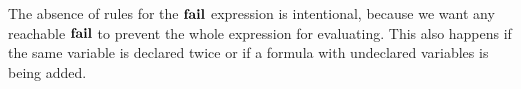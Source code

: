 \begin{center}
\begin{minipage}[t]{0.45\textwidth}
  \begin{prooftree}
  \end{prooftree}
\end{minipage}
\begin{minipage}[t]{0.45\textwidth}
  \begin{prooftree}
  \end{prooftree}
\end{minipage}
\end{center}

\bigskip

\begin{prooftree}
\end{prooftree}

\bigskip

\begin{prooftree}
\end{prooftree}

\bigskip

\begin{prooftree}
\end{prooftree}

\bigskip

\begin{prooftree}
\end{prooftree}

\bigskip

The absence of rules for the $\failE$ expression is intentional, because we want 
any reachable $\failE$ to prevent the whole expression for evaluating. This also happens
if the same variable is declared twice or if a formula with undeclared
variables is being added.

